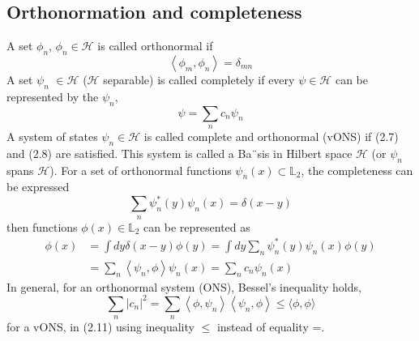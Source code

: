 \subsection{Orthonormation and completeness}
A set {$\phi_n$}, $\phi_n\in\mathcal{H}$ is called orthonormal if
\begin{equation}
    \left\langle\phi_{m}, \phi_{n}\right\rangle=\delta_{m n}
    \end{equation}
A set {$\psi_n$} $\in\mathcal{H}$ ($\mathcal{H}$ separable) is called completely if every $\psi\in\mathcal{H}$ can be represented by the {$\psi_n$},
\begin{equation}
    \psi=\sum_{n} c_{n} \psi_{n}
    \end{equation}
A system of states ${\psi_n}\in\mathcal{H}$ is called complete and orthonormal (vONS) if (2.7) and (2.8) are satisfied. This system is called a Ba¨sis in Hilbert space $\mathcal{H}$ (or {$\psi_n$} spans $\mathcal{H}$). For a set of orthonormal functions ${\psi_n(x)}\subset\mathbb{L}_2$, the completeness can be expressed
\begin{equation}
    \sum_{n} \psi_{n}^{*}(y) \psi_{n}(x)=\delta(x-y)
    \end{equation}
then functions $\phi(x)\in\mathbb{L}_2$ can be represented as
\begin{equation}
\begin{aligned} \phi(x) &=\int d y \delta(x-y) \phi(y)=\int d y \sum_{n} \psi_{n}^{*}(y) \psi_{n}(x) \phi(y) \\ &=\sum_{n}\left\langle\psi_{n}, \phi\right\rangle \psi_{n}(x)=\sum_{n} c_{n} \psi_{n}(x) \end{aligned}
\end{equation}
In general, for an orthonormal system (ONS), Bessel's inequality holds,
\begin{equation}
    \sum_{n}\left|c_{n}\right|^{2}=\sum_{n}\left\langle\phi, \psi_{n}\right\rangle\left\langle\psi_{n}, \phi\right\rangle \leq\langle\phi, \phi\rangle
    \end{equation}
for a vONS, in (2.11) using inequality $\leq$ instead of  equality =.


